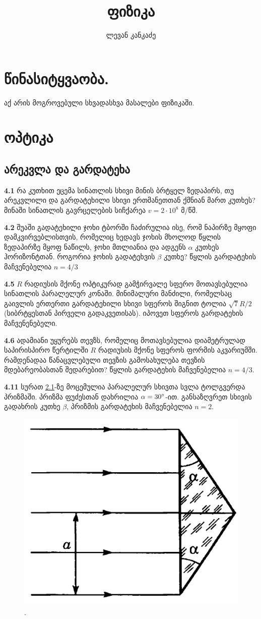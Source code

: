 \documentclass[a4paper]{book}
\title{ფიზიკა}
\author{ლევან კანკაძე}
\begin{document}
\maketitle

\tableofcontents

\chapter{წინასიტყვაობა.}
აქ არის მოგროვებული სხვადასხვა მასალები ფიზიკაში.

\chapter{ოპტიკა}
\section{არეკვლა და გარდატეხა}
\qquad \textbf{4.1} რა კუთხით ეცემა სინათლის სხივი მინის ბრტყელ ზედაპირს, თუ არეკვლილი და გარდატეხილი სხივი ერთმანეთთან ქმნიან მართ კუთხეს? მინაში სინათლის გავრცელების სიჩქარეა $v = 2 \cdot 10^8$ მ/წმ.

\textbf{4.2} შუაში გადატეხილი ჯოხი ტბორში ჩაძირულია ისე, რომ ნაპირზე მყოფი დამკვირვებლისთვის, რომელიც ხედავს ჯოხის მხოლოდ წყლის ზედაპირზე მყოფ ნაწილს, ჯოხი მთლიანია და ადგენს $\alpha$ კუთხეს ჰორიზონტთან. როგორია ჯოხის გადატეხვის $\beta$ კუთხე? წყლის გარდატეხის მაჩვენებელია $n = 4/3$

\textbf{4.5}
$R$ რადიუსის მქონე ოპტიკურად გამჭირვალე სფერო მოთავსებულია სინათლის პარალელურ კონაში. მინიმალური 
მანძილი, რომელსაც გაივლის ერთერთი გარდატეხილი სხივი სფეროს შიგნით ტოლია $\sqrt{7}R/2$ (სიბრტყესთან პირველი გადაკვეთისას). იპოვეთ სფეროს გარდატეხის მაჩვენენებელი.

\textbf{4.6} ადამიანი უყურებს თევზს, რომელიც მოთავსებულია დიამეტრულად საპირისპირო წერტილში $R$ რადიუსის მქონე სფეროს ფორმის აკვარიუმში. რამდენადაა წანაცვლებული თევზის გამოსახულება თევზის მდებარეობასთან შედარებით? წყლის გარდატეხის მაჩვენებელია $n = 4/3$.

\textbf{4.11} სურათ \ref{fig:4_11}-ზე მოცემულია პარალელურ სხივთა სვლა ტოლგვერდა პრიზმაში. პრიზმა ფუძესთან დახრილია $\alpha = 30 \degree$-ით. განსაზღვრეთ სხივის გადახრის კუთხე $\beta$, პრიზმის გარდატეხის მაჩვენებელია $n = 2$.
	\begin{figure}[h]
		   \centering
           \includegraphics[width=0.4\columnwidth]{figures/4_11}
           \caption{.}
           \label{fig:4_11}
        \end{figure}
\end{document}
